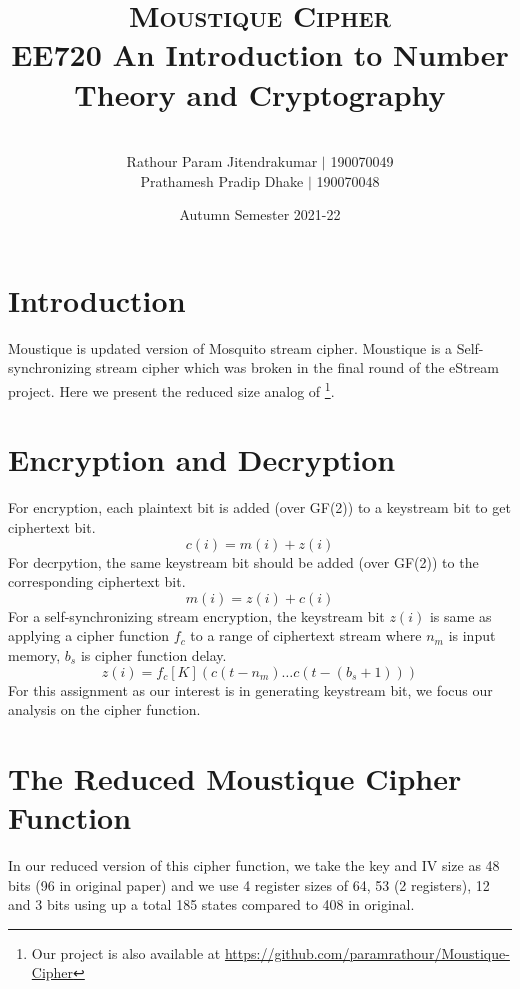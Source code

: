 \documentclass[a4paper,10pt]{article}
\title{\vspace*{-2em}\textsc{Moustique Cipher}\\[0.5em]\Large{{EE720 {An Introduction to Number Theory and Cryptography}}}}
\author{\\[-3em]Rathour Param Jitendrakumar $\vert$ 190070049\\Prathamesh Pradip
Dhake $\vert$ 190070048}
\date{\vspace*{-1em}Autumn Semester 2021-22}
\begin{document}
\maketitle
\tableofcontents
\section{Introduction}
Moustique\cite{v2} is updated version of Mosquito\cite{v3} stream cipher. Moustique is a Self-synchronizing stream cipher which was broken in the final round of the eStream project. Here we present the reduced size analog of \cite{v2}\footnote{Our project is also available at \url{https://github.com/paramrathour/Moustique-Cipher}}.
\section{Encryption and Decryption}
For encryption, each plaintext bit is added (over GF(2)) to a keystream bit to get ciphertext bit.
\begin{equation}
    c(i) = m(i) + z(i)
\end{equation}
For decrpytion, the same keystream bit should be added (over GF(2)) to the corresponding ciphertext bit.
\begin{equation}
    m(i) = z(i) + c(i)
\end{equation}
For a self-synchronizing stream encryption, the keystream bit $z(i)$ is same as applying a cipher function $f_c$ to a range of ciphertext stream where $n_m$ is input memory, $b_s$ is cipher function delay.
\begin{equation}
    z(i) = f_c[K](c(t-n_m)\ldots c(t-(b_s+1)))
\end{equation}
For this assignment as our interest is in generating keystream bit, we focus our analysis on the cipher function.
\section{The Reduced Moustique Cipher Function}
In our reduced version of this cipher function, we take the key and IV size as 48 bits (96 in original paper) and we use 4 register sizes of 64, 53 (2 registers), 12 and 3 bits using up a total 185 states compared to 408 in original.
\end{document}
